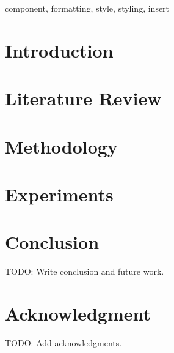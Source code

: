 \documentclass[conference]{IEEEtran}
\newif\ifshowplaceholders
\newcommand{\ph}[1]{%
  \ifshowplaceholders
    \textcolor{red}{\textbf{[PLACEHOLDER]} #1}%
  \else
    #1%
  \fi
}
\newenvironment{placeholderblock}{%
  \par\begingroup
  \ifshowplaceholders
    \color{red}\noindent\textbf{[PLACEHOLDER]}\par\smallskip
  \fi
}{%
  \par\endgroup
}
\begin{document}
\begin{abstract}
\begin{placeholderblock}
This document is a model and instructions for \LaTeX.
This and the IEEEtran.cls file define the components of your paper [title, text, heads, etc.]. *CRITICAL: Do Not Use Symbols, Special Characters, Footnotes,
or Math in Paper Title or Abstract.
\end{placeholderblock}
\end{abstract}

\begin{IEEEkeywords}
\ph{component, formatting, style, styling, insert}
\end{IEEEkeywords}

\section{Introduction}
\begin{placeholderblock}

\end{placeholderblock}

\section{Literature Review}



\section{Methodology}


\section{Experiments}


\section{Conclusion}
\begin{placeholderblock}
\ph{TODO: Write conclusion and future work.}
\end{placeholderblock}

\section*{Acknowledgment}
\begin{placeholderblock}
\ph{TODO: Add acknowledgments.}
\end{placeholderblock}


\end{document}
